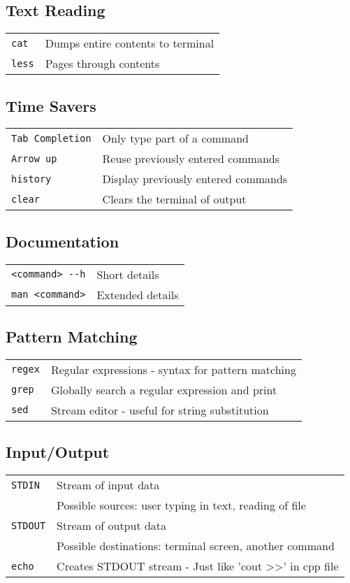 \documentclass[14pt,landscape]{extarticle}
\begin{document}
\begin{multicols}{2}
\subsection{Text Reading}
\begin{tabular}{@{}ll@{}}
\verb!cat!    & Dumps entire contents to terminal \\
\verb!less!  & Pages through contents \\
\end{tabular}

\subsection{Time Savers}
\begin{tabular}{@{}ll@{}}
\verb!Tab Completion!    & Only type part of a command \\
\verb!Arrow up!  & Reuse previously entered commands \\
\verb!history! & Display previously entered commands \\
\verb!clear! & Clears the terminal of output \\
\end{tabular}

\subsection{Documentation}
\begin{tabular}{@{}ll@{}}
\verb!<command> --h!    & Short details \\
\verb!man <command>!  & Extended details\\
\end{tabular}

\subsection{Pattern Matching}
\begin{tabular}{@{}ll@{}}
\verb!regex!  & Regular expressions - syntax for pattern matching \\
\verb!grep!    & Globally search a regular expression and print \\
\verb!sed! & Stream editor - useful for string substitution
\end{tabular}

\subsection{Input/Output}
\begin{tabular}{@{}ll@{}}
\verb!STDIN!    & Stream of input data \\
\verb!!    & Possible sources: user typing in text, reading of file \\
\verb!STDOUT!  & Stream of output data \\
\verb!!  & Possible destinations: terminal screen, another command \\
\verb!echo! & Creates STDOUT stream - Just like 'cout \textgreater\textgreater' in cpp file
\end{tabular}


\end{multicols}
\end{document}
